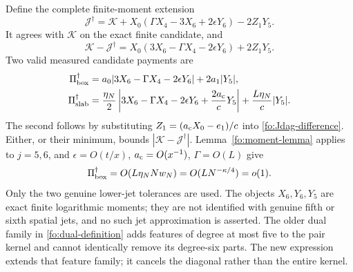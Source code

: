 \documentclass[11pt]{article}
\numberwithin{equation}{section}
\theoremstyle{definition}
\theoremstyle{remark}
\begin{document}
Define the complete finite-moment extension
\begin{equation}
\mathcal J^\dagger=\mathcal K
       +X_0(\Gamma X_4-3X_6+2\epsilon Y_6)-2Z_1Y_5.
\label{fo:Jdag}
\end{equation}
It agrees with $\mathcal K$ on the exact finite candidate, and
\begin{equation}
\mathcal K-\mathcal J^\dagger
 =X_0(3X_6-\Gamma X_4-2\epsilon Y_6)+2Z_1Y_5.
\label{fo:Jdag-difference}
\end{equation}
Two valid measured candidate payments are
\begin{align}
\Pi^\dagger_{\rm box}
 &=a_0|3X_6-\Gamma X_4-2\epsilon Y_6|+2a_1|Y_5|,
 \label{fo:Jdag-payment}\\
\Pi^\dagger_{\rm slab}
 &=\frac{\eta_N}{2}
 \left|3X_6-\Gamma X_4-2\epsilon Y_6+\frac{2a_{\rm c}}cY_5\right|
             +\frac{L\eta_N}{c}|Y_5|.\nonumber
\end{align}
The second follows by substituting
$Z_1=(a_{\rm c}X_0-e_1)/c$ into \eqref{fo:Jdag-difference}.
Either, or their minimum, bounds
$|\mathcal K-\mathcal J^\dagger|$.  Lemma~\ref{fo:moment-lemma}
applies to $j=5,6$, and
$\epsilon=O(t/x)$, $a_{\rm c}=O(x^{-1})$, $\Gamma=O(L)$ give
\begin{equation}
\Pi^\dagger_{\rm box}=O(L\eta_NNw_N)
                        =O(LN^{-\kappa/4})=o(1).
\label{fo:Jdag-payment-scale}
\end{equation}
Only the two genuine lower-jet tolerances are used.
The objects $X_6,Y_6,Y_5$ are exact finite logarithmic moments; they
are not identified with genuine fifth or sixth spatial jets, and no
such jet approximation is asserted.  The older dual family in
\eqref{fo:dual-definition} adds features of degree at most five to
the pair kernel and cannot identically remove its degree-six parts.
The new expression extends that feature family; it cancels the diagonal
rather than the entire kernel.
\end{document}

